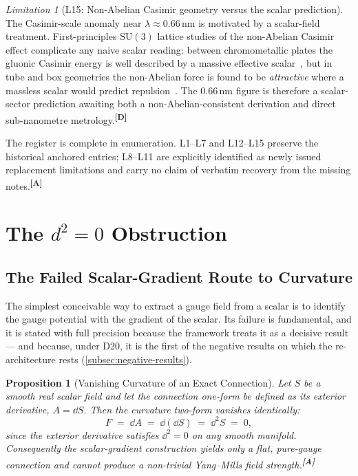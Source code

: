 \documentclass[12pt,a4paper,twoside]{article}
\theoremstyle{plain}
\newtheorem{proposition}[theorem]{Proposition}
\theoremstyle{definition}
\theoremstyle{remark}
\newtheorem{limitation}[theorem]{Limitation}
\newcommand{\catmark}[1]{\textsuperscript{\textsf{\textbf{[#1]}}}}
\begin{document}
\begin{limitation}[L15: Non-Abelian Casimir geometry versus the scalar prediction]
\label{lim:L15}
The Casimir-scale anomaly near $\lambda \approx 0.66\,\mathrm{nm}$ is
motivated by a scalar-field treatment. First-principles $\mathrm{SU}(3)$
lattice studies of the non-Abelian Casimir effect complicate any naive
scalar reading: between chromometallic plates the gluonic Casimir energy
is well described by a massive effective scalar~\cite{chernodub2023}, but in tube and box
geometries the non-Abelian force is found to be \emph{attractive} where
a massless scalar would predict repulsion~\cite{ngwenya2025}. The $0.66\,\mathrm{nm}$
figure is therefore a scalar-sector prediction awaiting both a
non-Abelian-consistent derivation and direct sub-nanometre metrology.\catmark{D}
\end{limitation}

\noindent The register is complete in enumeration. L1--L7 and
L12--L15 preserve the historical anchored entries; L8--L11 are explicitly
identified as newly issued replacement limitations and carry no claim of
verbatim recovery from the missing notes.\catmark{A}

\newpage
\section{The \texorpdfstring{$d^2 = 0$}{d2=0} Obstruction}
\label{sec:d2-obstruction}

\subsection{The Failed Scalar-Gradient Route to Curvature}
\label{subsec:failed-scalar-gradient}

The simplest conceivable way to extract a gauge field from a scalar is
to identify the gauge potential with the gradient of the scalar. Its
failure is fundamental, and it is stated with full precision because the
framework treats it as a decisive result --- and because, under D20, it
is the first of the negative results on which the re-architecture
rests (\cref{subsec:negative-results}).

\begin{proposition}[Vanishing Curvature of an Exact Connection]
\label{prop:d2-obstruction}
Let $S$ be a smooth real scalar field and let the connection one-form be
defined as its exterior derivative, $A = \dd S$. Then the curvature
two-form vanishes identically:
\[
 F \;=\; \dd A \;=\; \dd(\dd S) \;=\; \dd^2 S \;=\; 0,
\]
since the exterior derivative satisfies $\dd^2 = 0$ on any smooth
manifold. Consequently the scalar-gradient construction yields only a
flat, pure-gauge connection and cannot produce a non-trivial Yang--Mills
field strength.\catmark{A}
\end{proposition}
\end{document}
